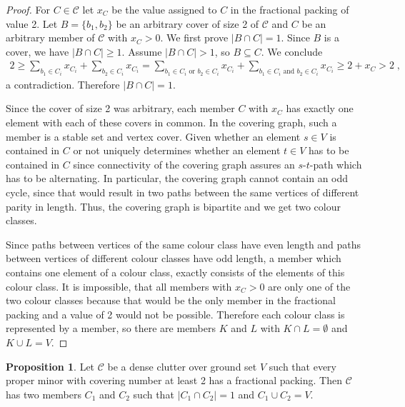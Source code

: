 \documentclass[a4paper, 12pt, twoside=false]{scrbook}
\theoremstyle{definition}
\newtheorem{proposition}[theorem]{Proposition}
\begin{document}
   \begin{proof}
       For $C \in \mathcal{C}$ let $x_C$ be the value assigned to $C$ in the fractional packing of value 2.
       Let $B=\{b_1,b_2\}$ be an arbitrary cover of size 2 of $\mathcal{C}$ and $C$ be an arbitrary member of $\mathcal{C}$ with $x_{C} > 0$.
       We first prove $|B\cap C| = 1$.
       Since $B$ is a cover, we have $|B\cap C| \geq 1$.
       Assume $|B \cap C| > 1$, so $B \subseteq C$.
       We conclude
       \begin{align*}
           2 \geq \sum_{b_1 \in C_i} x_{C_i} + \sum_{b_2 \in C_i} x_{C_i} = \sum_{b_1 \in C_i \text{ or } b_2 \in C_i} x_{C_i} + \sum_{b_1 \in C_i \text{ and } b_2 \in C_i} x_{C_i} \geq 2 + x_C > 2 \;,
       \end{align*}
       a contradiction. Therefore $|B\cap C| = 1$.

       Since the cover of size 2 was arbitrary, each member $C$ with $x_C$ has exactly one element with each of these covers in common.
       In the covering graph, such a member is a stable set and vertex cover.
       Given whether an element $s \in V$ is contained in $C$ or not uniquely determines whether an element $t \in V$ has to be contained in $C$ since connectivity of the covering graph assures an $s$-$t$-path which has to be alternating.
       In particular, the covering graph cannot contain an odd cycle, since that would result in two paths between the same vertices of different parity in length. Thus, the covering graph is bipartite and we get two colour classes.

       Since paths between vertices of the same colour class have even length and paths between vertices of different colour classes have odd length, a member which contains one element of a colour class, exactly consists of the elements of this colour class.
       It is impossible, that all members with $x_C > 0$ are only one of the two colour classes because that would be the only member in the fractional packing and a value of 2 would not be possible.
       Therefore each colour class is represented by a member, so there are members $K$ and $L$ with $K \cap L = \emptyset$ and $K \cup L = V$.

   \end{proof}

   \begin{proposition}\label{twomember}
       Let $\mathcal{C}$ be a dense clutter over ground set $V$ such that every proper minor with covering number at least 2 has a fractional packing.
       Then $\mathcal{C}$ has two members $C_1$ and $C_2$ such that $|C_1 \cap C_2|=1$ and $C_1 \cup C_2 = V$.
   \end{proposition}
\end{document}
